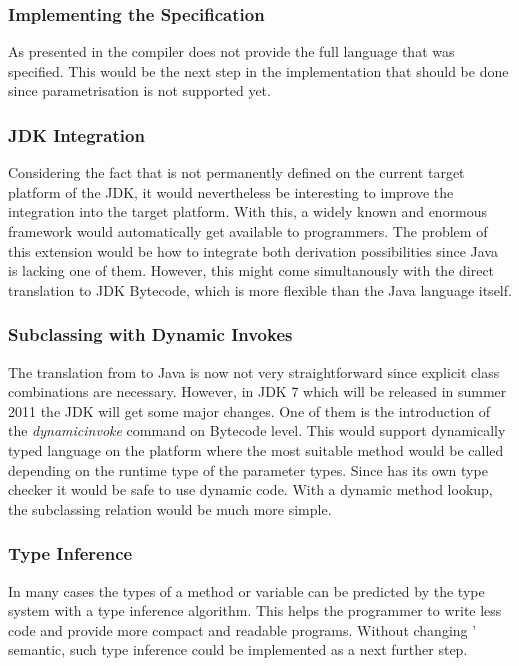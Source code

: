 \subsubsection{Implementing the Specification}
As presented in  the compiler does not provide the
full language that was specified. This would be the next step in the
implementation that should be done since parametrisation is not supported
yet.

\subsubsection{JDK Integration}
Considering the fact that \ooplss is not permanently defined on the current
target platform of the JDK, it would nevertheless be interesting to
improve the integration into the target platform. With this, a widely
known and enormous framework would automatically get available to
\ooplss programmers. The problem of this extension would be how to integrate
both derivation possibilities since Java is lacking one of them. However,
this might come simultanously with the direct translation to JDK
Bytecode, which is more flexible than the Java language itself.

\subsubsection{Subclassing with Dynamic Invokes}
The translation from \ooplss to Java is now not very straightforward since
explicit class combinations are necessary. However, in JDK 7 which will
be released in summer 2011 the JDK will get some major changes. One
of them is the introduction of the \emph{dynamicinvoke} command on
Bytecode level. This would support dynamically typed language on the
platform where the most suitable method would be called depending on the
runtime type of the parameter types. Since \ooplss has its own type
checker it would be safe to use dynamic code. With a dynamic method
lookup, the subclassing relation would be much more simple.

\subsubsection{Type Inference}
In many cases the types of a method or variable can be predicted
by the type system with a type inference algorithm. This helps
the programmer to write less code and provide more compact and readable
programs. Without changing \ooplss' semantic, such type inference
could be implemented as a next further step.

